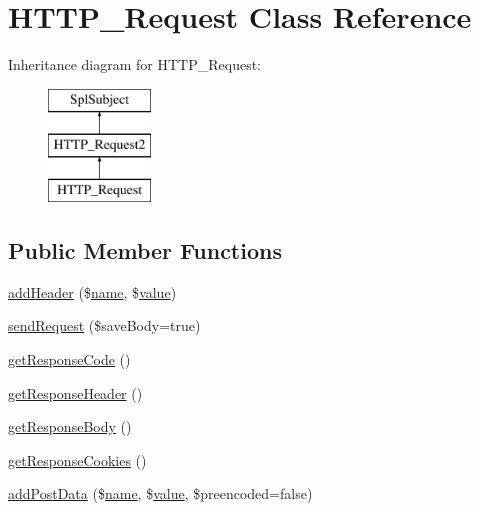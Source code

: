 \hypertarget{classHTTP__Request}{}\section{H\+T\+T\+P\+\_\+\+Request Class Reference}
\label{classHTTP__Request}
Inheritance diagram for H\+T\+T\+P\+\_\+\+Request\+:\begin{figure}[H]
\begin{center}
\leavevmode
\includegraphics[height=3.000000cm]{classHTTP__Request}
\end{center}
\end{figure}
\subsection*{Public Member Functions}
\begin{DoxyCompactItemize}
\item 
\hyperlink{classHTTP__Request_ad7ce4b414109089320151442d1aa23d3}{add\+Header} (\$\hyperlink{common_8js_a22c29d2aa8ed6161ce8faa718ef76e68}{name}, \$\hyperlink{common_2js_2jquery_8js_abe5393d870043cf6aaa1d5ad5fce755c}{value})
\item 
\hyperlink{classHTTP__Request_af3e8b1423f6a2858652063c4a6f697a0}{send\+Request} (\$save\+Body=true)
\item 
\hyperlink{classHTTP__Request_adca0e2580505791e5ad42f7737568ade}{get\+Response\+Code} ()
\item 
\hyperlink{classHTTP__Request_a821d6c29dea6073a0d7f5e414d1237a6}{get\+Response\+Header} ()
\item 
\hyperlink{classHTTP__Request_a8cf9237fc5a74cc2d797b64b7823db08}{get\+Response\+Body} ()
\item 
\hyperlink{classHTTP__Request_a5fc2cc22a0652620d6866994397f5418}{get\+Response\+Cookies} ()
\item 
\hyperlink{classHTTP__Request_a3b856946e8c0ccc2c84dac7c7e93bd9d}{add\+Post\+Data} (\$\hyperlink{common_8js_a22c29d2aa8ed6161ce8faa718ef76e68}{name}, \$\hyperlink{common_2js_2jquery_8js_abe5393d870043cf6aaa1d5ad5fce755c}{value}, \$preencoded=false)
\end{DoxyCompactItemize}
